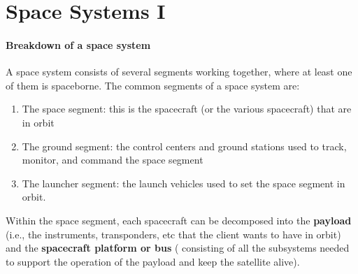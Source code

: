 \section[Space Systems I]{Space Systems I}
 
\paragraph{Breakdown of a space system}

A space system consists of several segments working together, where at least
one of them is spaceborne. The common segments of a space system are:
%
\begin{enumerate}
\item The space segment: this is the spacecraft (or the various spacecraft) 
that are in orbit
\item The ground segment: the control centers and ground stations used to 
track, monitor, and command the space segment
\item The launcher segment: the launch vehicles used to set the space segment 
in orbit.
\end{enumerate}
%
Within the space segment, each spacecraft can be decomposed into the 
\textbf{payload} (i.e., the instruments, transponders, etc that the client 
wants to have in orbit) and the \textbf{spacecraft platform or bus} (
consisting of all the subsystems needed to support the operation of the 
payload and keep the satellite alive).

